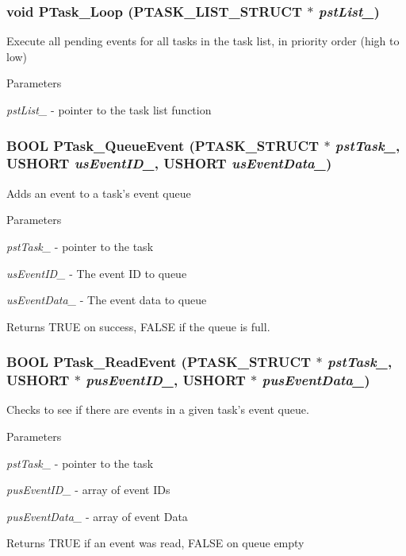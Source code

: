 \subsubsection[{PTask\_\-Loop}]{\setlength{\rightskip}{0pt plus 5cm}void PTask\_\-Loop ({\bf PTASK\_\-LIST\_\-STRUCT} $\ast$ {\em pstList\_\-})}\label{ptask_8h_af3d5193f9a8ace23109ffd399b3a1a8f}
Execute all pending events for all tasks in the task list, in priority order (high to low)


\begin{DoxyParams}{Parameters}
\item[{\em pstList\_\-}]-\/ pointer to the task list function \end{DoxyParams}
\subsubsection[{PTask\_\-QueueEvent}]{\setlength{\rightskip}{0pt plus 5cm}BOOL PTask\_\-QueueEvent ({\bf PTASK\_\-STRUCT} $\ast$ {\em pstTask\_\-}, \/  USHORT {\em usEventID\_\-}, \/  USHORT {\em usEventData\_\-})}\label{ptask_8h_afc271184bbf5c40598ce8d7d7e1d8b7c}
Adds an event to a task's event queue


\begin{DoxyParams}{Parameters}
\item[{\em pstTask\_\-}]-\/ pointer to the task \item[{\em usEventID\_\-}]-\/ The event ID to queue \item[{\em usEventData\_\-}]-\/ The event data to queue \end{DoxyParams}
\begin{DoxyReturn}{Returns}
TRUE on success, FALSE if the queue is full. 
\end{DoxyReturn}
\subsubsection[{PTask\_\-ReadEvent}]{\setlength{\rightskip}{0pt plus 5cm}BOOL PTask\_\-ReadEvent ({\bf PTASK\_\-STRUCT} $\ast$ {\em pstTask\_\-}, \/  USHORT $\ast$ {\em pusEventID\_\-}, \/  USHORT $\ast$ {\em pusEventData\_\-})}\label{ptask_8h_a6771d6c40157f14e1b583749f63c4ce5}
Checks to see if there are events in a given task's event queue.


\begin{DoxyParams}{Parameters}
\item[{\em pstTask\_\-}]-\/ pointer to the task \item[{\em pusEventID\_\-}]-\/ array of event IDs \item[{\em pusEventData\_\-}]-\/ array of event Data \end{DoxyParams}
\begin{DoxyReturn}{Returns}
TRUE if an event was read, FALSE on queue empty 
\end{DoxyReturn}
